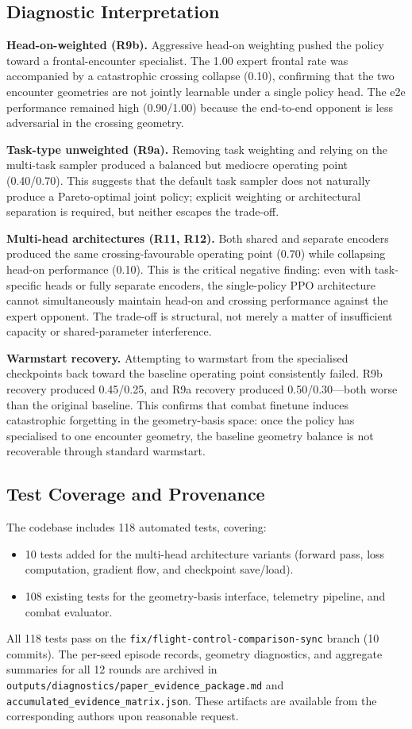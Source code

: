 \documentclass[drones,article,submit,pdftex,moreauthors]{Definitions/mdpi}
\begin{document}
\subsection{Diagnostic Interpretation}

\textbf{Head-on-weighted (R9b).} Aggressive head-on weighting pushed the policy toward a frontal-encounter specialist. The 1.00 expert frontal rate was accompanied by a catastrophic crossing collapse (0.10), confirming that the two encounter geometries are not jointly learnable under a single policy head. The e2e performance remained high (0.90/1.00) because the end-to-end opponent is less adversarial in the crossing geometry.

\textbf{Task-type unweighted (R9a).} Removing task weighting and relying on the multi-task sampler produced a balanced but mediocre operating point (0.40/0.70). This suggests that the default task sampler does not naturally produce a Pareto-optimal joint policy; explicit weighting or architectural separation is required, but neither escapes the trade-off.

\textbf{Multi-head architectures (R11, R12).} Both shared and separate encoders produced the same crossing-favourable operating point (0.70) while collapsing head-on performance (0.10). This is the critical negative finding: even with task-specific heads or fully separate encoders, the single-policy PPO architecture cannot simultaneously maintain head-on and crossing performance against the expert opponent. The trade-off is structural, not merely a matter of insufficient capacity or shared-parameter interference.

\textbf{Warmstart recovery.} Attempting to warmstart from the specialised checkpoints back toward the baseline operating point consistently failed. R9b recovery produced 0.45/0.25, and R9a recovery produced 0.50/0.30---both worse than the original baseline. This confirms that combat finetune induces catastrophic forgetting in the geometry-basis space: once the policy has specialised to one encounter geometry, the baseline geometry balance is not recoverable through standard warmstart.

\subsection{Test Coverage and Provenance}

The codebase includes 118 automated tests, covering:
\begin{itemize}
    \item 10 tests added for the multi-head architecture variants (forward pass, loss computation, gradient flow, and checkpoint save/load).
    \item 108 existing tests for the geometry-basis interface, telemetry pipeline, and combat evaluator.
\end{itemize}
All 118 tests pass on the \texttt{fix/flight-control-comparison-sync} branch (10 commits). The per-seed episode records, geometry diagnostics, and aggregate summaries for all 12 rounds are archived in \texttt{outputs/diagnostics/paper\_evidence\_package.md} and \texttt{accumulated\_evidence\_matrix.json}. These artifacts are available from the corresponding authors upon reasonable request.
\end{document}
